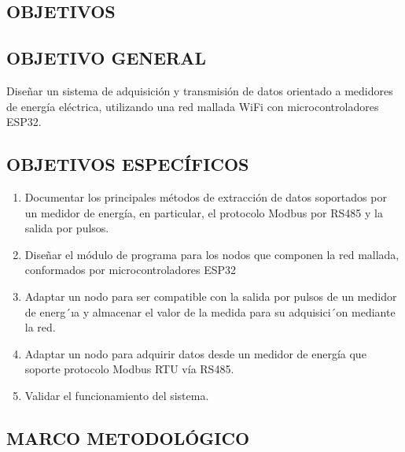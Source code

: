 \documentclass[12pt,letterpaper]{article}
\begin{document}
 \newpage


 \begin{center}
 	\section*{OBJETIVOS}
 \end{center}

\vspace{1cm}

\subsection*{OBJETIVO GENERAL}

Diseñar un sistema de adquisición y transmisión de datos orientado a medidores de energía eléctrica, utilizando una red mallada WiFi con microcontroladores ESP32.

\subsection*{OBJETIVOS ESPECÍFICOS}


\begin{enumerate}[1.]
	
	
	 \item Documentar los principales métodos de extracción de datos soportados por un medidor de energía, en particular, el protocolo Modbus por RS485 y la salida por pulsos.
	
	 \item Diseñar el módulo de programa para los nodos que componen la red mallada, conformados por microcontroladores ESP32
	
	 \item Adaptar un nodo para ser compatible con la salida por pulsos de un medidor de energ´ıa y almacenar el valor de la medida para su adquisici´on mediante la red.
	
	 \item Adaptar un nodo para adquirir datos desde un medidor de energía que soporte protocolo Modbus RTU vía RS485.
	
	 \item Validar el funcionamiento del sistema.
 	
 	
 	
 	
 	

\end{enumerate}
\newpage



\begin{center}
	
	\section*{ MARCO METODOLÓGICO}
	
\end{center}
\end{document}
